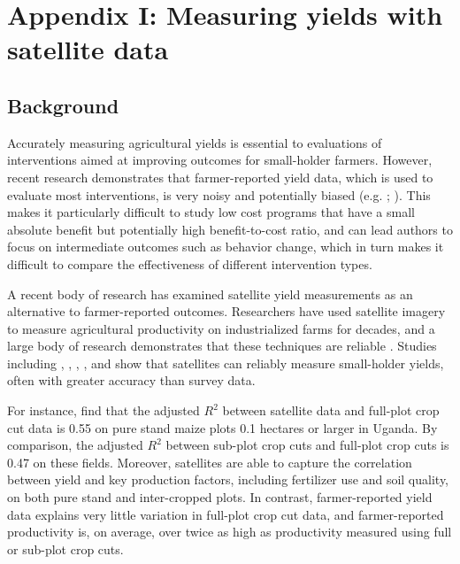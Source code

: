 \documentclass{article}
\begin{document}
\section{Appendix I: Measuring yields with satellite data} \label{appendix-1}

\subsection{Background}

Accurately measuring agricultural yields is essential to evaluations of interventions aimed at improving outcomes for small-holder farmers. However, recent research demonstrates that farmer-reported yield data, which is used to evaluate most interventions, is very noisy and potentially biased (e.g. \citet{Carletto2015FromPolicies}; \citet{Lobell2019EyesAnalysis}). This makes it particularly difficult to study low cost programs that have a small absolute benefit but potentially high benefit-to-cost ratio, and can lead authors to focus on intermediate outcomes such as behavior change, which in turn makes it difficult to compare the effectiveness of different intervention types.

A recent body of research has examined satellite yield measurements as an alternative to farmer-reported outcomes. Researchers have used satellite imagery to measure agricultural productivity on industrialized  farms for decades, and a large body of research demonstrates that these techniques are reliable \citep{Lobell2013}. Studies including \citet{Jain2016MappingData}, \citet{Burke2017Satellite-basedSystems}, \citet{Lambert2018EstimatingBelt}, \citet{Lobell2019EyesAnalysis}, and \citet{Lobell2019SightMali} show that satellites can reliably measure small-holder yields, often with greater accuracy than survey data. 

For instance, \citet{Lobell2019EyesAnalysis} find that the adjusted $R^2$ between satellite data and full-plot crop cut data is 0.55 on pure stand maize plots 0.1 hectares or larger in Uganda. By comparison, the adjusted $R^2$ between sub-plot crop cuts and full-plot crop cuts is 0.47 on these fields. Moreover, satellites are able to capture the correlation between yield and key production factors, including fertilizer use and soil quality, on both pure stand and inter-cropped plots. In contrast, farmer-reported yield data explains very little variation in full-plot crop cut data, and farmer-reported productivity is, on average, over twice as high as productivity measured using full or sub-plot crop cuts. 
\end{document}
